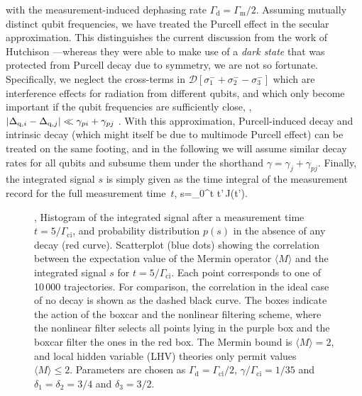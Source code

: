 \ee
with the measurement-induced dephasing rate $\Gamma_\text{d}=\Gamma_\text{m}/2$. Assuming mutually distinct qubit frequencies, we have treated the Purcell effect in the secular approximation. This distinguishes the current discussion from the work of Hutchison \etal---whereas they were able to make use of a \emph{dark state} that was protected from Purcell decay due to symmetry, we are not so fortunate. Specifically, we neglect the cross-terms in $\mathcal{D}[\sigma^-_1+\sigma^-_2-\sigma^-_3]$ which are interference effects for radiation from different qubits, and which only become important if the qubit frequencies are sufficiently close, \ie, $\left\lvert \Delta_{\text{q},i}-\Delta_{\text{q},j}\right\rvert\ll\gamma_{pi}+\gamma_{pj}$ \cite{majer_coupling_2007, hutchison_quantum_2008}. With this approximation, Purcell-induced decay and intrinsic decay (which might itself be due to multimode Purcell effect) can be treated on the same footing, and in the following we will assume similar decay rates for all qubits and subsume them under the shorthand $\gamma=\gamma_{j}+\gamma_{pj}$. Finally, the integrated signal $s$ is simply given as the time integral of the measurement record for the full measurement time~$t$,%
\be\label{eq:sfromJ}
    s=\int_0^t \rmd t'\,J(t').
\ee

\begin{figure}[t]%
\centering
{}
    \caption[GHZ state preparation in presence of decay]
    {
        , Histogram of the integrated signal after a measurement time $t = 5/\Gamma_\text{ci}$, and probability distribution $p(s)$ in the absence of any decay (red curve).  Scatterplot (blue dots) showing the correlation between the expectation value of the Mermin operator $\langle M \rangle$ and the integrated signal $s$ for $t = 5/\Gamma_\text{ci}$. Each point corresponds to one of 10\,000 trajectories. For comparison, the correlation in the ideal case of no decay is shown as the dashed black curve. The boxes indicate the action of the boxcar and the nonlinear filtering scheme, where the nonlinear filter selects all points lying in the purple box and the boxcar filter the ones in the red box. The Mermin bound is $\langle M \rangle=2$, and local hidden variable (LHV) theories only permit values $\langle M \rangle\le2$. Parameters are chosen as $\Gamma_\text{d} = \Gamma_\text{ci}/2$, $\gamma/\Gamma_\text{ci}= 1/35$ and $\delta_1 = \delta_2 = 3/4$ and $\delta_3 = 3/2$.\label{fig:figure2}}
\end{figure}
